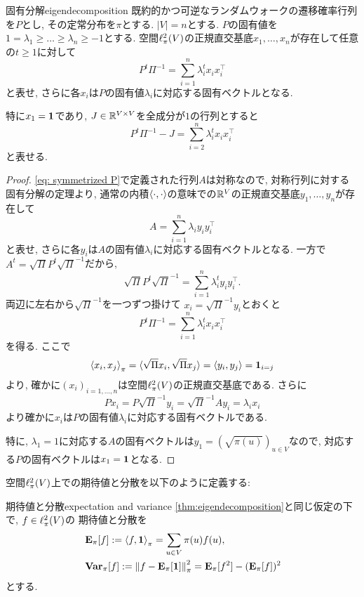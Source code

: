 %
\begin{theorem}{固有分解}{eigendecomposition}
    既約的かつ可逆なランダムウォークの遷移確率行列を$P$とし, その定常分布を$\pi$とする.
    $|V|=n$とする.
    $P$の固有値を$1=\lambda_1\ge \dots \ge \lambda_n \ge -1$とする.
    空間$\ell^2_\pi(V)$の正規直交基底$x_1,\dots,x_n$が存在して任意の$t\ge 1$に対して
    \[ P^t\Pi^{-1} = \sum_{i=1}^n \lambda_i^t x_i x_i^{\top}  \]
    と表せ, さらに各$x_i$は$P$の固有値$\lambda_i$に対応する固有ベクトルとなる.

    特に$x_1 = \mathbf{1}$であり,
    $J \in \mathbb{R}^{V \times V}$を全成分が$1$の行列とすると
    \[ P^t \Pi^{-1} - J =  \sum_{i=2}^n \lambda_i^t x_i x_i^\top \]
    と表せる.
\end{theorem}
\begin{proof}
    \cref{eq: symmetrized P}で定義された行列$A$は対称なので,
    対称行列に対する固有分解の定理より,
    通常の内積$\langle\cdot, \cdot\rangle$の意味での$\mathbb{R}^V$の正規直交基底$y_1,\dots,y_n$が存在して
    \[
        A = \sum_{i=1}^n \lambda_i y_i y_i^\top
    \]
    と表せ, さらに各$y_i$は$A$の固有値$\lambda_i$に対応する固有ベクトルとなる.
    一方で$A^t = \sqrt{\Pi} P^t \sqrt{\Pi}^{-1}$だから,
    \[
        \sqrt{\Pi} P^t \sqrt{\Pi}^{-1} = \sum_{i=1}^n \lambda_i^t y_i y_i^\top.
    \]
    両辺に左右から$\sqrt{\Pi}^{-1}$を一つずつ掛けて
    $x_i = \sqrt{\Pi}^{-1}y_i$とおくと
    \[
        P^t \Pi^{-1} = \sum_{i=1}^n \lambda_i^t x_i x_i^\top
    \]
    を得る.
    ここで
    \[
        \left\langle x_i,x_j\right\rangle_{\pi} = \langle\sqrt{\Pi}x_i,\sqrt{\Pi}x_j\rangle = \langle y_i,y_j\rangle = \mathbf{1}_{i=j}
    \]
    より, 確かに$(x_i)_{i=1,\dots,n}$は空間$\ell^2_\pi(V)$の正規直交基底である.
    さらに
    \[
        Px_i = P\sqrt{\Pi}^{-1}y_i = \sqrt{\Pi}^{-1}Ay_i = \lambda_i x_i
    \]
    より確かに$x_i$は$P$の固有値$\lambda_i$に対応する固有ベクトルである.

    特に, $\lambda_1=1$に対応する$A$の固有ベクトルは$y_1 = (\sqrt{\pi(u)})_{u \in V}$なので,
    対応する$P$の固有ベクトルは$x_1 = \mathbf{1}$となる.
\end{proof}
%
空間$\ell^2_\pi(V)$上での期待値と分散を以下のように定義する:
\begin{definition}{期待値と分散}{expectation and variance}
    \cref{thm:eigendecomposition}と同じ仮定の下で,
    $f \in \ell^2_\pi(V)$の
    期待値と分散を
    \begin{align}
         & \operatorname*{\mathbf{E}_{\pi}}[f] \mathrel{:=} \left\langle f,\mathbf{1}\right\rangle_{\pi} = \sum_{u\in V}\pi(u) f(u), \label{eq:mean}                       \\
         & \operatorname*{\mathbf{Var}_{\pi}}[f] \mathrel{:=} \left\lVert f - \operatorname*{\mathbf{E}_{\pi}}[\mathbf{1}]\right\rVert_{\pi}^2 = \operatorname*{\mathbf{E}_{\pi}} [f^2] - (\operatorname*{\mathbf{E}_{\pi}} [f])^2 \label{eq:variance}
    \end{align}
    とする.
\end{definition}
